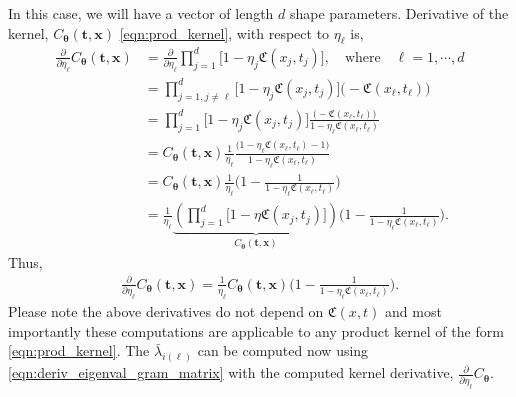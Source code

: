 \documentclass{iitthesis}          %
\newcommand{\bm}[1]{\boldsymbol{#1}}
\newcommand{\vtheta}{{\bm{\theta}}}
\newcommand{\vt}{\bm{t}}
\newcommand{\vx}{\bm{x}}
\begin{document}
In this case, we will have a vector of length $d$ shape parameters. Derivative of the kernel, $C_\vtheta(\vt, \vx)$ \eqref{eqn:prod_kernel}, with respect to $\eta_\ell$ is,
\begin{align*}
\frac{\partial}{\partial \eta_\ell} C_\vtheta(\vt, \vx) 
& =
\frac{\partial}{\partial \eta_\ell} 
\prod_{j=1}^d \biggl[
1 - \eta_j \mathfrak{C}(x_j,t_j) \biggr], \quad \text{where} \quad \ell = 1, \cdots, d
\\
& = 
\prod_{j=1, j \neq \ell}^d \biggl[
1 - \eta_j \mathfrak{C}(x_j,t_j) \biggr]
\biggl( - \mathfrak{C}(x_\ell,t_\ell) \biggr)
\\
& =
\prod_{j=1}^d \biggl[
1 - \eta_j \mathfrak{C}(x_j,t_j) \biggr]
\frac{
	\biggl( - \mathfrak{C}(x_\ell,t_\ell) \biggr)
}{
	1 - \eta_\ell \mathfrak{C}(x_\ell,t_\ell) 
}
\\
& =
C_\vtheta(\vt, \vx) 
\frac{1}{\eta_\ell}
\frac{
	\biggl(1 - \eta_\ell \mathfrak{C}(x_\ell,t_\ell)  - 1 \biggr)
}{
	1 - \eta_\ell \mathfrak{C}(x_\ell,t_\ell) 
}
\\
& =
C_\vtheta(\vt, \vx) 
\frac{1}{\eta_\ell}
\biggl(
1 - 
\frac{1
}{
	1 - \eta_\ell \mathfrak{C}(x_\ell,t_\ell) 
}
\biggr)
\\
& =
\frac{1}{\eta_\ell} 
\underbrace{
	\left(
	\prod_{j=1}^d \biggl[
	1 - \eta \mathfrak{C}(x_j,t_j) \biggr]
	\right) }_
{ C_\vtheta(\vt, \vx) }
\biggl(
1 - 
\frac{1}
{ 1 - \eta_\ell \mathfrak{C}(x_\ell, t_\ell) }
\biggr) 
.
\end{align*}
Thus, 
\begin{align*}
\frac{\partial}{\partial \eta_\ell} C_\vtheta(\vt, \vx) = \frac{1}{\eta_\ell} 
{ C_\vtheta(\vt, \vx) }
\biggl(
1 - 
\frac{1}
{ 1 - \eta_\ell \mathfrak{C}(x_\ell,t_\ell) }
\biggr).
\end{align*}
Please note the above derivatives do not depend on $\mathfrak{C}(x,t)$ and most importantly these computations are applicable to any product kernel of the form \eqref{eqn:prod_kernel}.
The $\bar{\lambda}_{i(\ell)}$ can be computed now using \eqref{eqn:deriv_eigenval_gram_matrix} with the computed kernel derivative, $\frac{\partial}{\partial \eta_\ell} C_\vtheta$.
\end{document}
